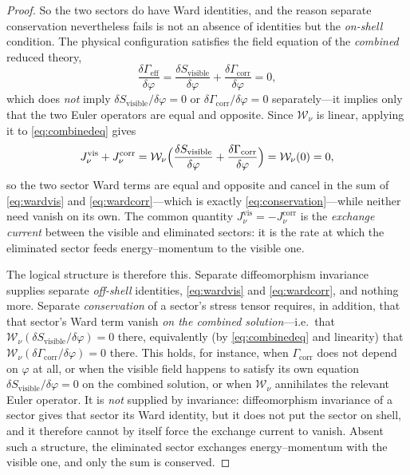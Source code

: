 \documentclass[11pt,reqno]{amsart}
\numberwithin{equation}{section}
\theoremstyle{plain}
\theoremstyle{definition}
\theoremstyle{remark}
\newcommand{\Geff}{\Gamma_{\mathrm{eff}}}
\newcommand{\Gcorr}{\Gamma_{\mathrm{corr}}}
\newcommand{\Svis}{S_{\mathrm{visible}}}
\begin{document}
\begin{proof}
So the two sectors do have Ward identities, and the reason separate conservation nevertheless
fails is not an absence of identities but the \emph{on-shell} condition. The physical
configuration satisfies the field equation of the \emph{combined} reduced theory,
\begin{equation}
\label{eq:combinedeq}
\frac{\delta\Geff}{\delta\varphi}
=\frac{\delta\Svis}{\delta\varphi}+\frac{\delta\Gcorr}{\delta\varphi}=0 ,
\end{equation}
which does \emph{not} imply $\delta\Svis/\delta\varphi=0$ or $\delta\Gcorr/\delta\varphi=0$
separately---it implies only that the two Euler operators are equal and opposite. Since
$\mathcal{W}_{\nu}$ is linear, applying it to \eqref{eq:combinedeq} gives
\[
J^{\mathrm{vis}}_{\nu}+J^{\mathrm{corr}}_{\nu}
=\mathcal{W}_{\nu}\Bigl(\frac{\delta\Svis}{\delta\varphi}
+\frac{\delta\Gcorr}{\delta\varphi}\Bigr)
=\mathcal{W}_{\nu}(0)=0 ,
\]
so the two sector Ward terms are equal and opposite and cancel in the sum of
\eqref{eq:wardvis} and \eqref{eq:wardcorr}---which is exactly \eqref{eq:conservation}---while
neither need vanish on its own. The common quantity
$J^{\mathrm{vis}}_{\nu}=-J^{\mathrm{corr}}_{\nu}$ is the \emph{exchange current} between the
visible and eliminated sectors: it is the rate at which the eliminated sector feeds
energy--momentum to the visible one.

The logical structure is therefore this. Separate diffeomorphism invariance supplies separate
\emph{off-shell} identities, \eqref{eq:wardvis} and \eqref{eq:wardcorr}, and nothing more.
Separate \emph{conservation} of a sector's stress tensor requires, in addition, that that
sector's Ward term vanish \emph{on the combined solution}---i.e.\ that
$\mathcal{W}_{\nu}(\delta\Svis/\delta\varphi)=0$ there, equivalently (by \eqref{eq:combinedeq}
and linearity) that $\mathcal{W}_{\nu}(\delta\Gcorr/\delta\varphi)=0$ there. This holds, for
instance, when $\Gcorr$ does not depend on $\varphi$ at all, or when the visible field happens
to satisfy its own equation $\delta\Svis/\delta\varphi=0$ on the combined solution, or when
$\mathcal{W}_{\nu}$ annihilates the relevant Euler operator. It is \emph{not} supplied by
invariance: diffeomorphism invariance of a sector gives that sector its Ward identity, but it
does not put the sector on shell, and it therefore cannot by itself force the exchange current
to vanish. Absent such a structure, the eliminated sector exchanges energy--momentum with the
visible one, and only the sum is conserved.
\end{proof}
\end{document}
